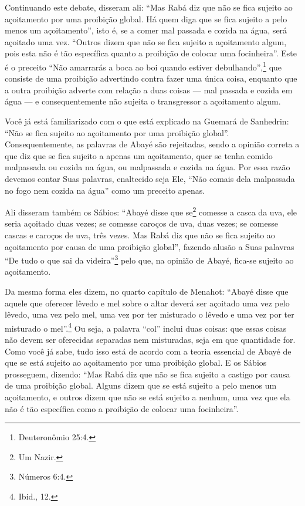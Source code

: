 Continuando este debate, disseram ali: ``Mas Rabá diz que não se fica
sujeito ao açoitamento por uma proibição global. Há quem diga que se
fica sujeito a pelo menos um açoitamento'', isto é, se a comer mal
passada e cozida na água, será açoitado uma vez. ``Outros dizem que não
se fica sujeito a açoitamento algum, pois esta não é tão específica
quanto a proibição de colocar uma focinheira''. Este é o preceito ``Não
amarrarás a boca ao boi quando estiver debulhando'',\footnote{Deuteronômio
25:4.} que consiste de uma proibição advertindo contra fazer uma única
coisa, enquanto que a outra proibição adverte com relação a duas coisas
--- mal passada e cozida em água --- e consequentemente não sujeita o
transgressor a açoitamento algum.


Você já está familiarizado com o que está explicado na Guemará de
Sanhedrin: ``Não se fica sujeito ao açoitamento por uma proibição
global''. Consequentemente, as palavras de Abayé são rejeitadas, sendo
a opinião correta a que diz que se fica sujeito a apenas um açoitamento,
quer se tenha comido malpassada ou cozida na água, ou malpassada e
cozida na água. Por essa razão devemos contar Suas palavras, enaltecido
seja Ele, ``Não comais dela malpassada no fogo nem cozida na água''
como um preceito apenas.

Ali disseram também os Sábios: ``Abayé disse que se\footnote{Um Nazir.\starr}
comesse a casca da uva, ele seria açoitado duas vezes; se comesse
caroços de uva, duas vezes; se comesse cascas e caroços de uva, três
vezes. Mas Rabá diz que não se fica sujeito ao açoitamento por causa de
uma proibição global'', fazendo alusão a Suas palavras ``De tudo o que
sai da videira''\footnote{Números 6:4.} pelo que, na opinião de Abayé, fica-se
sujeito ao açoitamento.

Da mesma forma eles dizem, no quarto capítulo de Menahot: ``Abayé disse
que aquele que oferecer lêvedo e mel sobre o altar deverá ser açoitado
uma vez pelo lêvedo, uma vez pelo mel, uma vez por ter misturado o
lêvedo e uma vez por ter misturado o mel''.\footnote{Ibid., 12.} Ou seja, a palavra
``col'' inclui duas coisas: que essas coisas não devem ser oferecidas
separadas nem misturadas, seja em que quantidade for. Como você já sabe,
tudo isso está de acordo com a teoria essencial de Abayé de que se está
sujeito ao açoitamento por uma proibição global. E os Sábios
prosseguem, dizendo: ``Mas Rabá diz que não se fica sujeito a castigo
por causa de uma proibição global. Alguns dizem que se está sujeito a
pelo menos um açoitamento, e outros dizem que não se está sujeito a
nenhum, uma vez que ela não é tão específica como a proibição de colocar
uma focinheira''.

